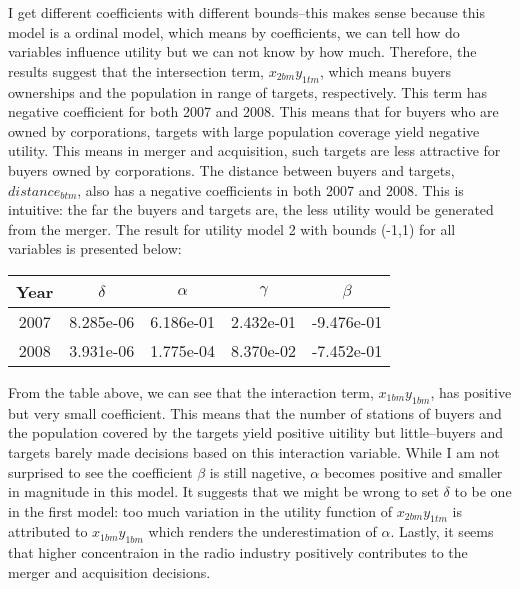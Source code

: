 \documentclass[12pt]{article}
\begin{document}
I get different coefficients with different bounds--this makes sense because this model is a ordinal model, which means by coefficients, we can tell how do variables influence utility but we can not know by how much. Therefore, the results suggest that the intersection term, $x_{2bm}y_{1tm}$, which means buyers ownerships and the population in range of targets, respectively. This term has negative coefficient for both 2007 and 2008. This means that for buyers who are owned by corporations, targets with large population coverage yield negative utility. This means in merger and acquisition, such targets are less attractive for buyers owned by corporations. 
The distance between buyers and targets, $distance_{btm}$, also has a negative coefficients in both 2007 and 2008. This is intuitive: the far the buyers and targets are, the less utility would be generated from the merger. 
The result for utility model 2 with bounds (-1,1) for all variables is presented below:
\begin{center}
	\begin{tabular}{||c c c c c ||} 
		\hline
		Year & $\delta$ & $\alpha$ &$\gamma$ & $\beta$\\ [0.5ex] 
		\hline\hline
		2007 & 8.285e-06 &6.186e-01 &2.432e-01    & -9.476e-01  \\ 
		\hline
		2008 & 3.931e-06 & 1.775e-04 &8.370e-02   &-7.452e-01   \\ [1ex] 
		\hline
	\end{tabular}
\end{center}

From the table above, we can see that the interaction term, $x_{1bm}y_{1bm}$, has positive but very small coefficient. This means that the number of stations of buyers and the population covered by the targets yield positive uitility but little--buyers and targets barely made decisions based on this interaction variable. While I am not surprised to see the coefficient $\beta$ is still nagetive, $\alpha$ becomes positive and smaller in magnitude in this model. It suggests that we might be wrong to set $\delta$ to be one in the first model: too much variation in the utility function of $x_{2bm}y_{1tm}$ is attributed to $x_{1bm}y_{1bm}$ which renders the underestimation of $\alpha$. Lastly, it seems that higher concentraion in the radio industry positively contributes to the merger and acquisition decisions. 
\end{document}
